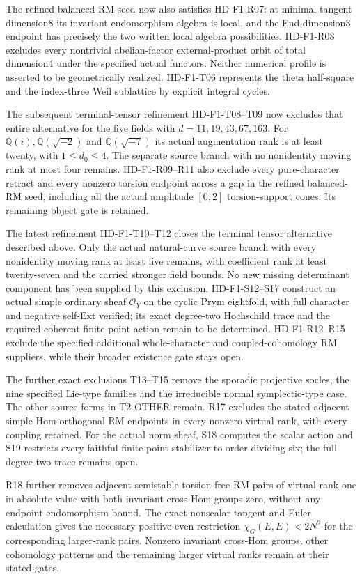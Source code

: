 The refined balanced-RM seed now also satisfies HD-F1-R07: at
minimal tangent dimension8 its invariant endomorphism algebra is
local, and the End-dimension3 endpoint has precisely the two written
local algebra possibilities. HD-F1-R08 excludes every nontrivial
abelian-factor external-product orbit of total dimension4 under the
specified actual functors. Neither numerical profile is asserted to
be geometrically realized. HD-F1-T06 represents the theta half-square
and the index-three Weil sublattice by explicit integral cycles.

The subsequent terminal-tensor refinement HD-F1-T08--T09 now
excludes that entire alternative for the five fields with
$d=11,19,43,67,163$. For $\mathbb Q(i),\mathbb Q(\sqrt{-2})$
and $\mathbb Q(\sqrt{-7})$ its actual augmentation rank is
at least twenty, with $1\le d_0\le4$. The separate source
branch with no nonidentity moving rank at most four remains.
HD-F1-R09--R11 also exclude every pure-character retract and
every nonzero torsion endpoint across a gap in the refined
balanced-RM seed, including all the actual amplitude $[0,2]$
torsion-support cones. Its remaining object gate is retained.


The latest refinement HD-F1-T10--T12 closes the terminal tensor
alternative described above. Only the actual natural-curve source
branch with every nonidentity moving rank at least five remains,
with coefficient rank at least twenty-seven and the carried stronger
field bounds. No new missing determinant component has been supplied
by this exclusion. HD-F1-S12--S17 construct an actual simple ordinary
sheaf $\mathcal O_Y$ on the cyclic Prym eightfold, with full character
and negative self-Ext verified; its exact degree-two Hochschild trace
and the required coherent finite point action remain to be determined.
HD-F1-R12--R15 exclude the specified additional whole-character and
coupled-cohomology RM suppliers, while their broader existence gate stays open.


The further exact exclusions T13--T15 remove the sporadic projective
socles, the nine specified Lie-type families and the irreducible
normal symplectic-type case. The other source forms in T2-OTHER remain.
R17 excludes the stated adjacent simple Hom-orthogonal RM endpoints
in every nonzero virtual rank, with every coupling retained.
For the actual norm sheaf, S18 computes the scalar action and S19
restricts every faithful finite point stabilizer to order dividing six;
the full degree-two trace remains open.


R18 further removes adjacent semistable torsion-free RM pairs of virtual
rank one in absolute value with both invariant cross-Hom groups zero,
without any endpoint endomorphism bound. The exact nonscalar tangent
and Euler calculation gives the necessary positive-even restriction
$\chi_G(E,E)<2N^2$ for the corresponding larger-rank pairs. Nonzero
invariant cross-Hom groups, other cohomology patterns and the remaining
larger virtual ranks remain at their stated gates.


